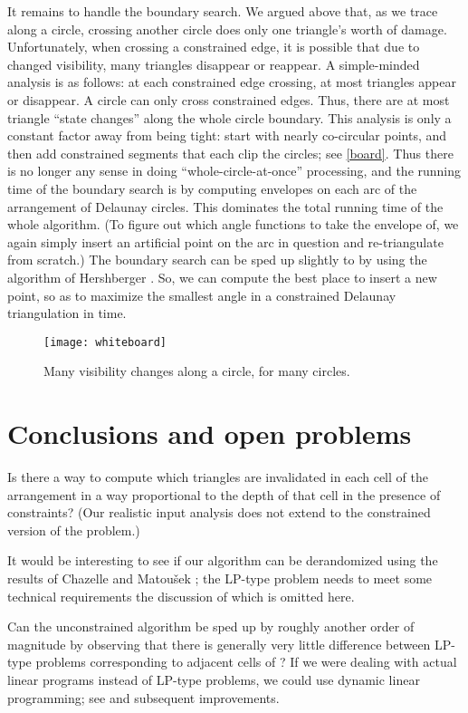 \documentclass{cccg13}
\begin{document}
It remains to handle the boundary search.  We argued above that, as we trace along a circle, crossing another circle does only one triangle's worth of damage.  Unfortunately, when crossing a constrained edge, it is possible that due to changed visibility, many triangles disappear or reappear.  A simple-minded analysis is as follows: at each constrained edge crossing, at most  triangles appear or disappear.  A circle can only cross  constrained edges.  Thus, there are at most  triangle ``state changes'' along the whole circle boundary.  This analysis is only a constant factor away from being tight: start with  nearly co-circular points, and then add  constrained segments that each clip the circles; see \autoref{board}.  Thus there is no longer any sense in doing ``whole-circle-at-once'' processing, and the running time of the boundary search is  by computing envelopes on each arc of the arrangement of Delaunay circles.  This dominates the total running time of the whole algorithm.  (To figure out which angle functions to take the envelope of, we again simply insert an artificial point on the arc in question and re-triangulate from scratch.)  The boundary search can be sped up slightly to  by using the algorithm of Hershberger \cite{Hersh}.  So, we can compute the best place to insert a new point, so as to maximize the smallest angle in a constrained Delaunay triangulation in  time.
\begin{figure}
  \centering
  \texttt{[image: whiteboard]}
  \caption{\label{board}Many visibility changes along a circle, for many circles.}
\end{figure}

\section{Conclusions and open problems}\label{sec:concl}
Is there a way to compute which triangles are invalidated in each cell of the arrangement in a way proportional to the depth of that cell in the presence of constraints?  (Our realistic input analysis does not extend to the constrained version of the problem.)

It would be interesting to see if our algorithm can be derandomized using the results of Chazelle and Matou\v sek \cite{derand}; the LP-type problem needs to meet some technical requirements the discussion of which is omitted here.

Can the unconstrained algorithm be sped up by roughly another order of magnitude by observing that there is generally very little difference between LP-type problems corresponding to adjacent cells of ?  If we were dealing with actual linear programs instead of LP-type problems, we could use dynamic linear programming; see \cite{dynamic} and subsequent improvements.
\end{document}
